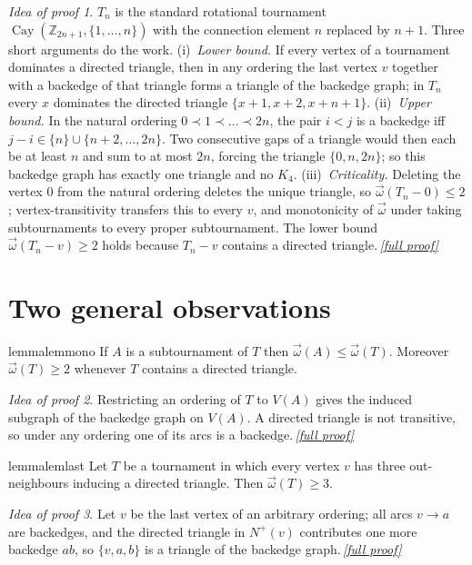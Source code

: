 \documentclass[11pt,a4paper]{article}
\theoremstyle{plain}
\theoremstyle{definition}
\theoremstyle{remark}
\newtheorem*{proofidea}{Idea of proof}
\newcommand{\fullproofref}[1]{\,\hyperref[#1]{\textit{[full proof]}}}
\newcommand{\cl}{\overrightarrow{\omega}}
\newcommand{\Z}{\mathbb Z}
\newcommand{\Cay}{\operatorname{Cay}}
\begin{document}
\begin{proofidea}
$T_n$ is the standard rotational tournament $\Cay(\Z_{2n+1},\{1,\dots,n\})$ with the connection element $n$ replaced by $n+1$. Three short arguments do the work.
(i)~\emph{Lower bound.} If every vertex of a tournament dominates a directed triangle, then in any ordering the last vertex $v$ together with a backedge of that triangle forms a triangle of the backedge graph; in $T_n$ every $x$ dominates the directed triangle $\{x+1,x+2,x+n+1\}$.
(ii)~\emph{Upper bound.} In the natural ordering $0\prec1\prec\dots\prec2n$, the pair $i<j$ is a backedge iff $j-i\in\{n\}\cup\{n+2,\dots,2n\}$. Two consecutive gaps of a triangle would then each be at least $n$ and sum to at most $2n$, forcing the triangle $\{0,n,2n\}$; so this backedge graph has exactly one triangle and no $K_4$.
(iii)~\emph{Criticality.} Deleting the vertex $0$ from the natural ordering deletes the unique triangle, so $\cl(T_n-0)\le2$; vertex-transitivity transfers this to every $v$, and monotonicity of $\cl$ under taking subtournaments to every proper subtournament. The lower bound $\cl(T_n-v)\ge2$ holds because $T_n-v$ contains a directed triangle.\fullproofref{pf:main}
\end{proofidea}

\section{Two general observations}

\begin{restatable}{lemma}{lemmono}\label{lem:mono}
If $A$ is a subtournament of $T$ then $\cl(A)\le\cl(T)$. Moreover $\cl(T)\ge2$ whenever $T$ contains a directed triangle.
\end{restatable}
\begin{proofidea}
Restricting an ordering of $T$ to $V(A)$ gives the induced subgraph of the backedge graph on $V(A)$. A directed triangle is not transitive, so under any ordering one of its arcs is a backedge.\fullproofref{pf:mono}
\end{proofidea}

\begin{restatable}{lemma}{lemlast}\label{lem:last}
Let $T$ be a tournament in which every vertex $v$ has three out-neighbours inducing a directed triangle. Then $\cl(T)\ge3$.
\end{restatable}
\begin{proofidea}
Let $v$ be the last vertex of an arbitrary ordering; all arcs $v\to a$ are backedges, and the directed triangle in $N^+(v)$ contributes one more backedge $ab$, so $\{v,a,b\}$ is a triangle of the backedge graph.\fullproofref{pf:last}
\end{proofidea}
\end{document}
